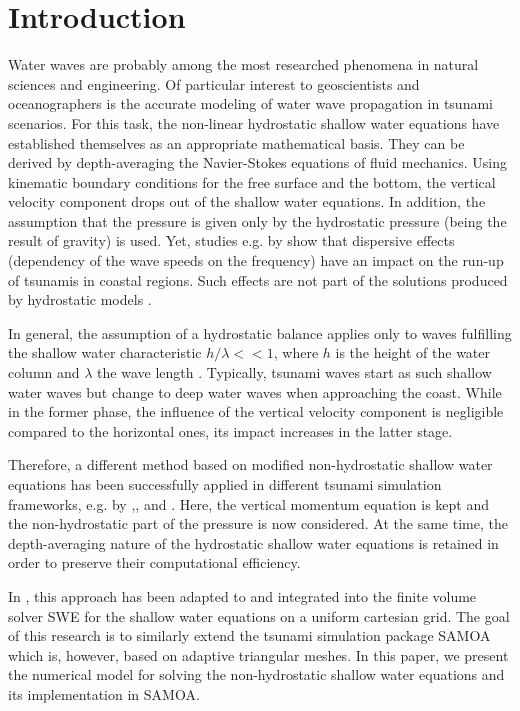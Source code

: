 
\section{Introduction}

Water waves are probably among the most researched phenomena in natural sciences and engineering. Of particular interest to geoscientists and oceanographers is the accurate modeling of water wave propagation in tsunami scenarios. For this task, the non-linear hydrostatic shallow water equations have established themselves as an appropriate mathematical basis. They can be derived by depth-averaging the Navier-Stokes equations of fluid mechanics. Using kinematic boundary conditions for the free surface and the bottom, the vertical velocity component drops out of the shallow water equations. In addition, the assumption that the pressure is given only by the hydrostatic pressure (being the result of gravity) is used. Yet, studies e.g. by \cite{horrillo} show that dispersive effects (dependency of the wave speeds on the frequency) have an impact on the run-up of tsunamis in coastal regions. Such effects are not part of the solutions produced by hydrostatic models \cite{horrillo}. 

In general, the assumption of a hydrostatic balance applies only to waves fulfilling the shallow water characteristic $h/\lambda <<1$, where $h$ is the height of the water column and $\lambda$ the wave length \cite{fuchs}. Typically, tsunami waves start as such shallow water waves but change to deep water waves when approaching the coast. While in the former phase, the influence of the vertical velocity component is negligible compared to the horizontal ones, its impact increases in the latter stage.

Therefore, a different method based on modified non-hydrostatic shallow water equations has been successfully applied in different tsunami simulation frameworks, e.g. by \cite{fuchs},\cite{cui},\cite{walters} and \cite{stelling2003accurate}. Here, the vertical momentum equation is kept and the non-hydrostatic part of the pressure is now considered. At the same time, the depth-averaging nature of the hydrostatic shallow water equations is retained in order to preserve their computational efficiency. 

In \cite{samfass14extension}, this approach has been adapted to and integrated into the finite volume solver SWE for the shallow water equations on a uniform cartesian grid. The goal of this research is to similarly extend the tsunami simulation package SAMOA which is, however, based on adaptive triangular meshes. In this paper, we present the numerical model for solving the non-hydrostatic shallow water equations and its implementation in SAMOA.

